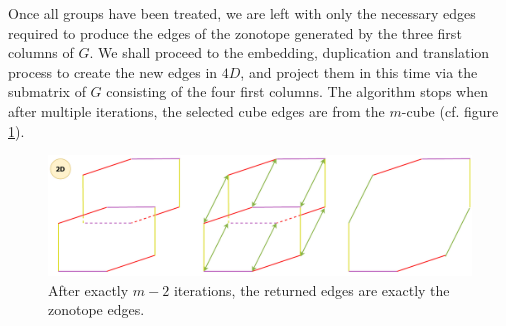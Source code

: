 Once all groups have been treated, we are left with only the necessary edges required to produce the edges of the zonotope generated by the three first columns of $G$. We shall proceed to the embedding, duplication and translation process to create the new edges in $4D$, and project them in this time via the submatrix of $G$ consisting of the four first columns. The algorithm stops when after multiple iterations, the selected cube edges are from the $m$-cube (cf. figure \ref{fig:zonotope_edges_elimination_end}).
\begin{figure}[!htb]
    \captionsetup{justification=centering}
    
    \centering
    \includegraphics[trim={0 0 0 0},clip,width=1\linewidth]{img/chapter_2/zonotope_edges_elimination_end.pdf}

    \caption{After exactly $m-2$ iterations, the returned edges are exactly the zonotope edges.}
    \label{fig:zonotope_edges_elimination_end}
\end{figure}


\clearpage 
